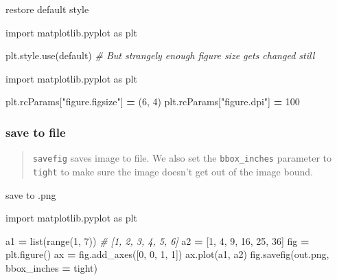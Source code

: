 \documentclass[
]{book}
\newenvironment{Shaded}{\begin{snugshade}}{\end{snugshade}}
\newcommand{\BuiltInTok}[1]{#1}
\newcommand{\CommentTok}[1]{\textcolor[rgb]{0.56,0.35,0.01}{\textit{#1}}}
\newcommand{\DecValTok}[1]{\textcolor[rgb]{0.00,0.00,0.81}{#1}}
\newcommand{\ImportTok}[1]{#1}
\newcommand{\NormalTok}[1]{#1}
\newcommand{\OperatorTok}[1]{\textcolor[rgb]{0.81,0.36,0.00}{\textbf{#1}}}
\newcommand{\StringTok}[1]{\textcolor[rgb]{0.31,0.60,0.02}{#1}}
\theoremstyle{definition}
\theoremstyle{definition}
\theoremstyle{definition}
\theoremstyle{definition}
\theoremstyle{remark}
\begin{document}
restore default style

\begin{Shaded}
\begin{Highlighting}[]
\ImportTok{import}\NormalTok{ matplotlib.pyplot }\ImportTok{as}\NormalTok{ plt}

\NormalTok{plt.style.use(}\StringTok{\textquotesingle{}default\textquotesingle{}}\NormalTok{) }\CommentTok{\# But strangely enough figure size gets changed still}
\end{Highlighting}
\end{Shaded}

\begin{Shaded}
\begin{Highlighting}[]
\ImportTok{import}\NormalTok{ matplotlib.pyplot }\ImportTok{as}\NormalTok{ plt}

\NormalTok{plt.rcParams[}\StringTok{"figure.figsize"}\NormalTok{] }\OperatorTok{=}\NormalTok{ (}\DecValTok{6}\NormalTok{, }\DecValTok{4}\NormalTok{)}
\NormalTok{plt.rcParams[}\StringTok{"figure.dpi"}\NormalTok{] }\OperatorTok{=} \DecValTok{100}
\end{Highlighting}
\end{Shaded}

\subsubsection{save to file}\label{save-to-file}

\begin{quote}
\texttt{savefig} saves image to file. We also set the \texttt{bbox\_inches} parameter to \texttt{tight} to make sure the image doesn't get out of the image bound.
\end{quote}

save to .png

\begin{Shaded}
\begin{Highlighting}[]
\ImportTok{import}\NormalTok{ matplotlib.pyplot }\ImportTok{as}\NormalTok{ plt}

\NormalTok{a1 }\OperatorTok{=} \BuiltInTok{list}\NormalTok{(}\BuiltInTok{range}\NormalTok{(}\DecValTok{1}\NormalTok{, }\DecValTok{7}\NormalTok{)) }\CommentTok{\# [1, 2, 3, 4, 5, 6]}
\NormalTok{a2 }\OperatorTok{=}\NormalTok{ [}\DecValTok{1}\NormalTok{, }\DecValTok{4}\NormalTok{, }\DecValTok{9}\NormalTok{, }\DecValTok{16}\NormalTok{, }\DecValTok{25}\NormalTok{, }\DecValTok{36}\NormalTok{]}
\NormalTok{fig }\OperatorTok{=}\NormalTok{ plt.figure()}
\NormalTok{ax }\OperatorTok{=}\NormalTok{ fig.add\_axes([}\DecValTok{0}\NormalTok{, }\DecValTok{0}\NormalTok{, }\DecValTok{1}\NormalTok{, }\DecValTok{1}\NormalTok{])}
\NormalTok{ax.plot(a1, a2)}
\NormalTok{fig.savefig(}\StringTok{\textquotesingle{}out.png\textquotesingle{}}\NormalTok{, bbox\_inches }\OperatorTok{=} \StringTok{\textquotesingle{}tight\textquotesingle{}}\NormalTok{)}
\end{Highlighting}
\end{Shaded}
\end{document}
